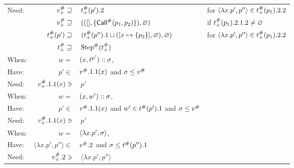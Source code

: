 \documentclass{article}
\begin{document}
\begin{center}
\begin{tabular}{|l@{\hskip2pt}r@{\hskip2pt}l@{\hskip2pt}l|}
		Need: & ${v}^{\#}_+\sqsupseteq$              & $\:{t}^{\#}_+(p').2$                                                     & for $\langle\lambda x.p',p''\rangle\in{t}^{\#}_+(p_1).2.2$ \\
		      & ${v}^{\#}_+\sqsupseteq$              & $\:(([],\{{\textsf{Call}}^{\#}(p_1,p_2)\}),\varnothing)$                             & if ${t}^{\#}_+(p_1).2.1.2\neq\varnothing$                  \\
		      & ${t}^{\#}_+(p')\sqsupseteq$       & $\:({t}^{\#}_+(p'').1\sqcup([x\mapsto\{p_2\}],\varnothing),\varnothing)$ & for $\langle\lambda x.p',p''\rangle\in{t}^{\#}_+(p_1).2.2$ \\
		      & ${t}^{\#}_+\sqsupseteq$           & $\:{\text{Step}}^{\#}({t}^{\#}_+)$                                                &                                                              \\
		\hline
		When: & $w=$                                & $(x,{\ell}^{p'})::\sigma$,                                          &                                                              \\
		Have: & $p'\in$                             & ${v}^{\#}.1.1(x)$ and $\sigma\le{v}^{\#}$                                      &                                                              \\
		Need: & ${v}^{\#}_+.1.1(x)\ni$               & $\:p'$                                                                     &                                                              \\
		\hline
		When: & $w=$                                & $(x,w')::\sigma$,                                                         &                                                              \\
		Have: & $p'\in$                             & ${v}^{\#}.1.1(x)$ and $w'\in{t}^{\#}(p').1$ and $\sigma\le{v}^{\#}$          &                                                              \\
		Need: & ${v}^{\#}_+.1.1(x)\ni$               & $\:p'$                                                                     &                                                              \\
		\hline
		When: & $w=$                                & $\langle\lambda x.p',\sigma\rangle$,                                         &                                                              \\
		Have: & $\langle\lambda x.p',p''\rangle\in$ & ${v}^{\#}.2$ and $\sigma\le{t}^{\#}(p'').1$                                 &                                                              \\
		Need: & ${v}^{\#}_+.2\ni$                    & $\:\langle\lambda x.p',p''\rangle$                                         &                                                              \\
		\hline
	\end{tabular}
\end{center}
\end{document}
